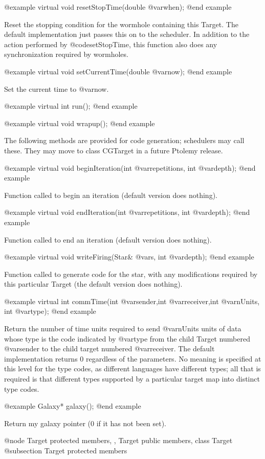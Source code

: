 @example
virtual void resetStopTime(double @var{when});
@end example

Reset the stopping condition for the wormhole containing this Target.
The default implementation just passes this on to the scheduler.  In
addition to the action performed by @code{setStopTime}, this function
also does any synchronization required by wormholes.

@example
virtual void setCurrentTime(double @var{now});
@end example

Set the current time to @var{now}.

@example
virtual int run();
@end example

@example
virtual void wrapup();
@end example

The following methods are provided for code generation; schedulers may
call these.  They may move to class CGTarget in a future Ptolemy release.

@example
virtual void beginIteration(int @var{repetitions}, int @var{depth});
@end example

Function called to begin an iteration (default version
does nothing).

@example
virtual void endIteration(int @var{repetitions}, int @var{depth});
@end example

Function called to end an iteration (default version
does nothing).

@example
virtual void writeFiring(Star& @var{s}, int @var{depth});
@end example

Function called to generate code for the star, with any modifications
required by this particular Target (the default version does nothing).

@example
virtual int commTime(int @var{sender},int @var{receiver},int @var{nUnits}, int @var{type});
@end example

Return the number of time units required to send @var{nUnits} units of
data whose type is the code indicated by @var{type} from the child Target
numbered @var{sender} to the child target numbered @var{receiver}.
The default implementation returns 0 regardless of the parameters.
No meaning is specified at this level for the type codes, as different
languages have different types; all that is required is that different
types supported by a particular target map into distinct type codes.

@example
Galaxy* galaxy();
@end example

Return my galaxy pointer (0 if it has not been set).

@node Target protected members,  , Target public members, class Target
@subsection Target protected members

